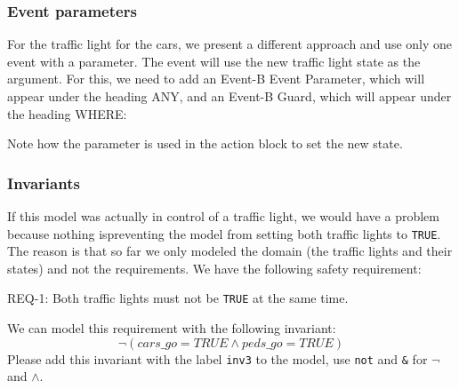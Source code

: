 \subsubsection{Event parameters}

For the traffic light for the cars, we present a different approach and use only one event with a parameter.  The event will use the new traffic light state as the argument. For this, we need to add an Event-B Event Parameter, which will appear under the heading \textsf{ANY}, and an Event-B Guard, which will appear under the heading \textsf{WHERE}: 


Note how the parameter is used in the action block to set the new state.

\subsubsection{Invariants}
\label{tutorial:invariants}

If this model was actually in control of a traffic light, we would have a problem because nothing ispreventing the model from setting both traffic lights to \texttt{TRUE}.  The reason is that so far we only modeled the domain (the traffic lights and their states) and not the requirements.  We have the following safety requirement:

\begin{center}REQ-1: Both traffic lights must not be \texttt{TRUE} at the same time.\end{center}

We can model this requirement with the following invariant:
\[
\lnot  (cars\_go = TRUE \land  peds\_go = TRUE)
\]
Please add this invariant with the label \texttt{inv3} to the model, use \texttt{not} and \texttt{\&} for $\lnot$ and $\land$.

